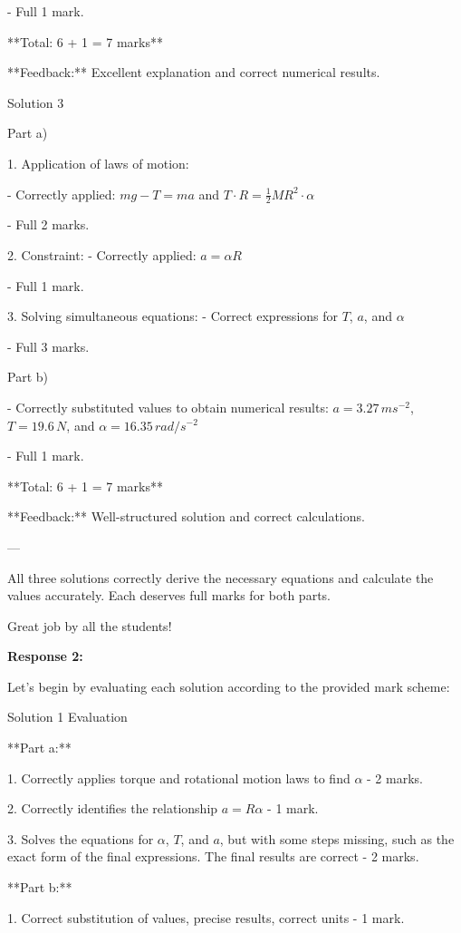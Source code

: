 \documentclass[a4paper,11pt]{article}
\begin{document}
- Full 1 mark.

**Total: 6 + 1 = 7 marks**

**Feedback:** Excellent explanation and correct numerical results.

Solution 3

Part a)

1. Application of laws of motion:

    - Correctly applied: \( m g - T = m a \) and \( T \cdot R = \frac{1}{2} M R^2 \cdot \alpha \)
    
    - Full 2 marks.

2. Constraint:
    - Correctly applied: \( a = \alpha R \)
    
    - Full 1 mark.

3. Solving simultaneous equations:
    - Correct expressions for \( T \), \( a \), and \( \alpha \)
    
    - Full 3 marks.

Part b)

- Correctly substituted values to obtain numerical results: \( a = 3.27 \, ms^{-2} \), \( T = 19.6 \, N \), and \( \alpha = 16.35 \, rad/s^{-2} \)

- Full 1 mark.

**Total: 6 + 1 = 7 marks**

**Feedback:** Well-structured solution and correct calculations.

---

All three solutions correctly derive the necessary equations and calculate the values accurately. Each deserves full marks for both parts. 

Great job by all the students!

\bigskip
\textbf{Response 2:}

Let's begin by evaluating each solution according to the provided mark scheme:

Solution 1 Evaluation

**Part a:**

1. Correctly applies torque and rotational motion laws to find \(\alpha\) - 2 marks.

2. Correctly identifies the relationship \(a = R\alpha\) - 1 mark.

3. Solves the equations for \(\alpha\), \(T\), and \(a\), but with some steps missing, such as the exact form of the final expressions. The final results are correct - 2 marks.

**Part b:**

1. Correct substitution of values, precise results, correct units - 1 mark.
\end{document}
